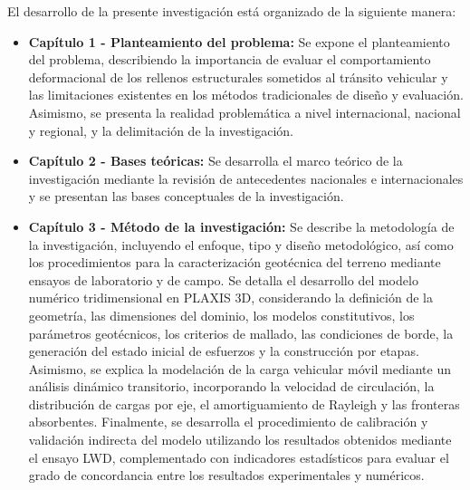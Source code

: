 El desarrollo de la presente investigación está organizado de la siguiente manera:

\begin{itemize}
	\item \textbf{Capítulo 1 - Planteamiento del problema:} Se expone el planteamiento del problema, describiendo la importancia de evaluar el comportamiento deformacional de los rellenos estructurales sometidos al tránsito vehicular y las limitaciones existentes en los métodos tradicionales de diseño y evaluación. Asimismo, se presenta la realidad problemática a nivel internacional, nacional y regional, y la delimitación de la investigación.
	
	
	\item \textbf{Capítulo 2 - Bases teóricas:} Se desarrolla el marco teórico de la investigación mediante la revisión de antecedentes nacionales e internacionales y se presentan las bases conceptuales de la investigación.
	
	
	
	\item \textbf{Capítulo 3 - Método de la investigación:} Se describe la metodología de la investigación, incluyendo el enfoque, tipo y diseño metodológico, así como los procedimientos para la caracterización geotécnica del terreno mediante ensayos de laboratorio y de campo. Se detalla el desarrollo del modelo numérico tridimensional en PLAXIS 3D, considerando la definición de la geometría, las dimensiones del dominio, los modelos constitutivos, los parámetros geotécnicos, los criterios de mallado, las condiciones de borde, la generación del estado inicial de esfuerzos y la construcción por etapas. Asimismo, se explica la modelación de la carga vehicular móvil mediante un análisis dinámico transitorio, incorporando la velocidad de circulación, la distribución de cargas por eje, el amortiguamiento de Rayleigh y las fronteras absorbentes. Finalmente, se desarrolla el procedimiento de calibración y validación indirecta del modelo utilizando los resultados obtenidos mediante el ensayo LWD, complementado con indicadores estadísticos para evaluar el grado de concordancia entre los resultados experimentales y numéricos.
	

\end{itemize}
